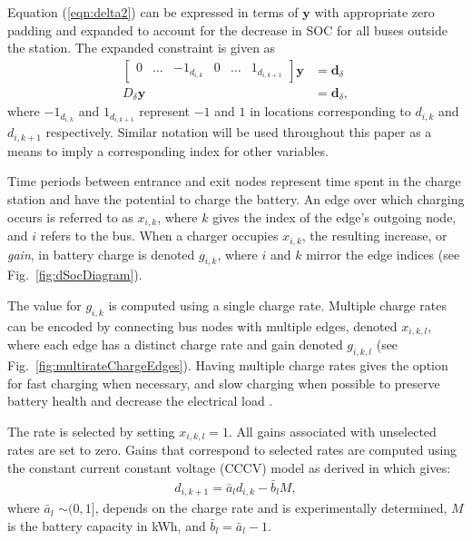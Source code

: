 Equation (\ref{eqn:delta2}) can be expressed in terms of $\mathbf{y}$ with appropriate zero padding and expanded to account for the decrease in SOC for all buses outside the station. The expanded constraint is given as 
\begin{equation}\label{eqn:deltaFinal}
	\begin{aligned}
		\begin{bmatrix}0 & \hdots & -1_{d_{i,k}} & 0 & \hdots & 1_{d_{i,k+1}} \end{bmatrix} \mathbf{y} &= \mathbf{d}_\delta \\
			D_\delta\mathbf{y} &= \mathbf{d}_\delta,
	\end{aligned}
\end{equation}
where $-1_{d_{i,k}}$ and $1_{d_{i,k+1}}$ represent $-1$ and $1$ in locations corresponding to $d_{i,k}$ and $d_{i,k+1}$ respectively. Similar notation will be used throughout this paper as a means to imply a corresponding index for other variables.
\par Time periods between entrance and exit nodes represent time spent in the charge station and have the potential to charge the battery. An edge over which charging occurs is referred to as $x_{i,k}$, where $k$ gives the index of the edge's outgoing node, and $i$ refers to the bus.  When a charger occupies $x_{i,k}$, the resulting increase, or \textit{gain}, in battery charge is denoted $g_{i,k}$, where $i$ and $k$ mirror the edge indices (see Fig.~\ref{fig:dSocDiagram}). 
\par The value for $g_{i,k}$ is computed using a single charge rate. Multiple charge rates can be encoded by connecting bus nodes with multiple edges, denoted $x_{i,k,l}$, where each edge has a distinct charge rate and gain denoted $g_{i,k,l}$ (see Fig.~\ref{fig:multirateChargeEdges}). Having multiple charge rates gives the option for fast charging when necessary, and slow charging when possible to preserve battery health and decrease the electrical load \cite{houbbadi_optimal_2019}.

\par The rate is selected by setting $x_{i,k,l} = 1$. All gains associated with unselected rates are set to zero. Gains that correspond to selected rates are computed using the constant current constant voltage (CCCV) model as derived in \cite{whitaker_network_2021} which gives:
\begin{align}\label{eqn:CCCV}
	d_{i,k+1} = \bar{a}_ld_{i,k} - \bar{b}_lM, 
\end{align}
where $\bar{a}_l$ $\sim(0,1]$, depends on the charge rate and is experimentally determined, $M$ is the battery capacity in kWh, and $\bar{b}_l = \bar{a}_l - 1$.
